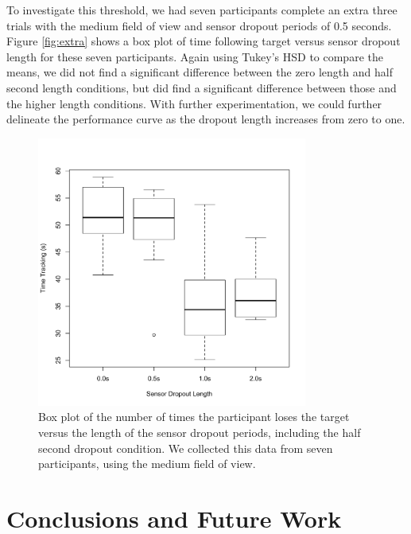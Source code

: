 \documentclass{acmsiggraph}                     %
\begin{document}
To investigate this threshold, we had seven participants complete an extra three trials with the medium field of view and sensor dropout periods of 0.5 seconds.  Figure \ref{fig:extra} shows a box plot of time following target versus sensor dropout length for these seven participants.  Again using Tukey's HSD to compare the means, we did not find a significant difference between the zero length and half second length conditions, but did find a significant difference between those and the higher length conditions.  
With further experimentation, we could further delineate the performance curve as the dropout length increases from zero to one.

\begin{figure}[htb]
	\centering
	\includegraphics[width=3.5in]{figures/extra.pdf}
	\caption{Box plot of the number of times the participant loses the target versus the length of the sensor dropout periods, including the half second dropout condition.  We collected this data from seven participants, using the medium field of view.}
\end{figure}


\section{Conclusions and Future Work}






\end{document}
